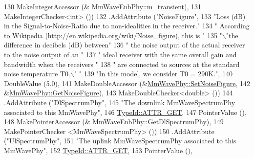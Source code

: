 \begin{DoxyCode}
130                                   MakeIntegerAccessor (&
      \hyperlink{classns3_1_1MmWaveEnbPhy_a60467889c9c76cba890f049098f4a822}{MmWaveEnbPhy::m\_transient}),
131                                   MakeIntegerChecker<int> ())
132         .AddAttribute (\textcolor{stringliteral}{"NoiseFigure"},
133                        \textcolor{stringliteral}{"Loss (dB) in the Signal-to-Noise-Ratio due to non-idealities in the receiver."}
134                        \textcolor{stringliteral}{" According to Wikipedia (http://en.wikipedia.org/wiki/Noise\_figure), this is "}
135                        \textcolor{stringliteral}{"\(\backslash\)"the difference in decibels (dB) between"}
136                        \textcolor{stringliteral}{" the noise output of the actual receiver to the noise output of an "}
137                        \textcolor{stringliteral}{" ideal receiver with the same overall gain and bandwidth when the receivers "}
138                        \textcolor{stringliteral}{" are connected to sources at the standard noise temperature T0.\(\backslash\)" "}
139                        \textcolor{stringliteral}{"In this model, we consider T0 = 290K."},
140                        DoubleValue (5.0),
141                        MakeDoubleAccessor (&\hyperlink{classns3_1_1MmWavePhy_a75ed96962f67af7d16ee2b6992ec042a}{MmWavePhy::SetNoiseFigure},
142                                            &\hyperlink{classns3_1_1MmWavePhy_ade17d33d06eea7205da2bdab6e5bb276}{MmWavePhy::GetNoiseFigure}),
143                        MakeDoubleChecker<double> ())
144          .AddAttribute (\textcolor{stringliteral}{"DlSpectrumPhy"},
145                                     \textcolor{stringliteral}{"The downlink MmWaveSpectrumPhy associated to this MmWavePhy"},
146                                     \hyperlink{classns3_1_1TypeId_a3ab7b43b95f96391c514d609ca60e542a3dd4b476c9b257285c177d6c414b5fd0}{TypeId::ATTR\_GET},
147                                     PointerValue (),
148                                     MakePointerAccessor (&
      \hyperlink{classns3_1_1MmWaveEnbPhy_a1fd12ed3e1da54288cf17a1bb9bcdf74}{MmWaveEnbPhy::GetDlSpectrumPhy}),
149                                     MakePointerChecker <MmWaveSpectrumPhy> ())
150          .AddAttribute (\textcolor{stringliteral}{"UlSpectrumPhy"},
151                                     \textcolor{stringliteral}{"The uplink MmWaveSpectrumPhy associated to this MmWavePhy"},
152                                     \hyperlink{classns3_1_1TypeId_a3ab7b43b95f96391c514d609ca60e542a3dd4b476c9b257285c177d6c414b5fd0}{TypeId::ATTR\_GET},
153                                     PointerValue (),

\end{DoxyCode}
